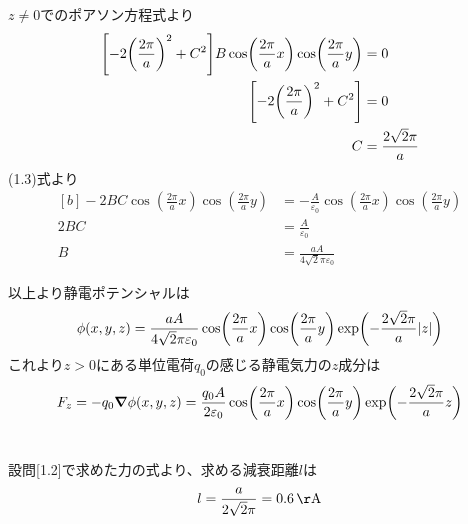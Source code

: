 \documentclass[../../master.tex]{subfiles}
\begin{document}
\(z\neq0\)でのポアソン方程式より
\begin{equation}\begin{aligned}[b]
    \qty[-2\qty(\frac{2\pi}{a})^2+C^2]B\cos(\frac{2\pi}{a}x)\cos(\frac{2\pi}{a}y) &= 0\\
    \qty[-2\qty(\frac{2\pi}{a})^2+C^2] &= 0\\
    C &= \frac{2\sqrt{2}\pi}{a}
\end{aligned}\end{equation}
(1.3)式より
\begin{equation}\begin{aligned}[b]
    -2BC\cos(\frac{2\pi}{a}x)\cos(\frac{2\pi}{a}y)
    &=-\frac{A}{\varepsilon_0}\cos(\frac{2\pi}{a}x)\cos(\frac{2\pi}{a}y)\\
    2BC &= \frac{A}{\varepsilon_0}\\
    B &= \frac{aA}{4\sqrt{2}\pi\varepsilon_0}
\end{aligned}\end{equation}

以上より静電ポテンシャルは
\begin{equation}\begin{aligned}[b]
    \phi(x,y,z) = \frac{aA}{4\sqrt{2}\pi\varepsilon_0}\cos(\frac{2\pi}{a}x)\cos(\frac{2\pi}{a}y)\exp(-\frac{2\sqrt{2}\pi}{a}\abs{z})
\end{aligned}\end{equation}
これより\(z>0\)にある単位電荷\(q_0\)の感じる静電気力の\(z\)成分は
\begin{equation}\begin{aligned}[b]
    F_z = -q_0\grad{\phi(x,y,z)} = \frac{q_0A}{2\varepsilon_0}\cos(\frac{2\pi}{a}x)\cos(\frac{2\pi}{a}y)\exp(-\frac{2\sqrt{2}\pi}{a}z)
\end{aligned}\end{equation}

\section{}
\subsection{}
設問[1.2]で求めた力の式より、求める減衰距離\(l\)は
\begin{equation}\begin{aligned}[b]
    l = \frac{a}{2\sqrt{2}\pi} = 0.6\,\si{\AA}
\end{aligned}\end{equation}
\end{document}

